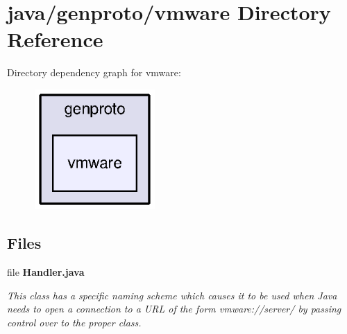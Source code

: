 \section{java/genproto/vmware Directory Reference}
\label{dir_ddc1521b0e0353c4b1a175d3ebf5eedb}
Directory dependency graph for vmware\+:
\nopagebreak
\begin{figure}[H]
\begin{center}
\leavevmode
\includegraphics[width=130pt]{dir_ddc1521b0e0353c4b1a175d3ebf5eedb_dep}
\end{center}
\end{figure}
\subsection*{Files}
\begin{DoxyCompactItemize}
\item 
file {\bf Handler.\+java}
\begin{DoxyCompactList}\small\item\em This class has a specific naming scheme which causes it to be used when Java needs to open a connection to a U\+R\+L of the form vmware\+://server/ by passing control over to the proper class. \end{DoxyCompactList}\end{DoxyCompactItemize}
